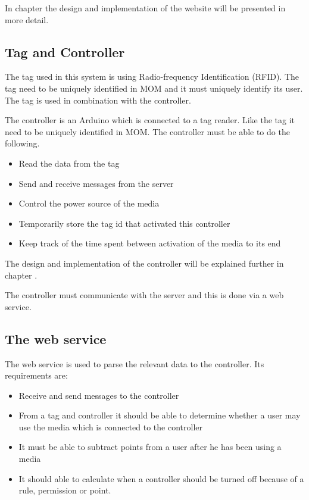 In chapter  the design and implementation of the website will be presented in more detail. 
 

\subsection{Tag and Controller}
The tag used in this system is using Radio-frequency Identification (RFID). The tag need to be uniquely identified in MOM and it must uniquely identify its user. The tag is used in combination with the controller.

The controller is an Arduino which is connected to a tag reader. Like the tag it need to be uniquely identified in MOM. The controller must be able to do the following.

\begin{itemize}
	\item Read the data from the tag
	\item Send and receive messages from the server
	\item Control the power source of the media 
	\item Temporarily store the tag id that activated this controller
	\item Keep track of the time spent between activation of the media to its end
\end{itemize}
 
The design and implementation of the controller will be explained further in chapter . 

The controller must communicate with the server and this is done via a web service.

\subsection{The web service}

The web service is used to parse the relevant data to the controller. Its requirements are:

\begin{itemize}
	\item Receive and send messages to the controller
	\item From a tag and controller it should be able to determine whether a user may use the media which is connected to the controller
	\item It must be able to subtract points from a user after he has been using a media
	\item It should able to calculate when a controller should be turned off because of a rule, permission or point.
\end{itemize}

